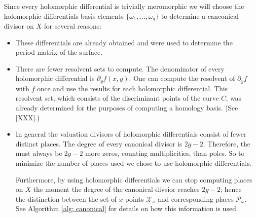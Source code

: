 \documentclass[12pt]{article}
\theoremstyle{definition}
\begin{document}
Since every holomorphic differential is trivially meromorphic we will
choose the holomorphic differentials basis elements $\{\omega_1, \ldots,
\omega_g\}$ to determine a canconical divisor on $X$ for several
reasons:
\begin{itemize}
\item These differentials are already obtained and were used to
  determine the period matrix of the surface.
\item There are fewer resolvent sets to compute. The denominator of
  every holomorphic differential is $\partial_y f(x,y)$. One can compute
  the resolvent of $\partial_y f$ with $f$ once and use the results for
  each holomorphic differential. This resolvent set, which consists of
  the discriminant points of the curve $C$, was already determined for
  the purposes of computing a homology basis. (See [XXX].)
\item In general the valuation divisors of holomorphic differentials
  consist of fewer distinct places. The degree of every canonical
  divisor is $2g-2$. Therefore, the must always be $2g-2$ more zeros,
  counting multiplicities, than poles. So to minimize the number of
  places used we chose to use holomorphic differentials.

  Furthermore, by using holomorphic differentials we can stop computing
  places on $X$ the moment the degree of the canonical divsior reaches
  $2g-2$; hence the distinction between the set of $x$-points
  $\mathcal{X}_\omega$ and corresponding places $\mathcal{P}_\omega$. See
  Algorithm \ref{alg: canonical} for details on how this information is
  used.
\end{itemize}
\end{document}

